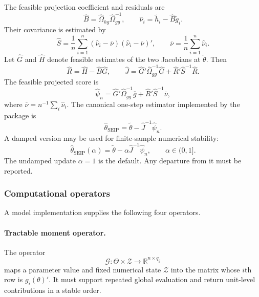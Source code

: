 The feasible projection coefficient and residuals are
\begin{equation}
 \widehat B
 =
 \widehat\Omega_{hg}
 \widehat\Omega_{gg}^{-1},
 \qquad
 \widehat\nu_i
 =
 \widetilde h_i-
 \widehat B\widetilde g_i.
 \label{eq:app_feasible_projection}
\end{equation}
Their covariance is estimated by
\begin{equation}
 \widehat S
 =
 \frac{1}{n}\sum_{i=1}^n
 (\widehat\nu_i-\overline\nu)
 (\widehat\nu_i-\overline\nu)',
 \qquad
 \overline\nu
 =
 \frac{1}{n}\sum_{i=1}^n\widehat\nu_i.
 \label{eq:app_feasible_S}
\end{equation}
Let $\widehat G$ and $\widehat H$ denote feasible estimates of the two
Jacobians at $\widetilde\theta$. Then
\begin{equation}
 \widehat R
 =
 \widehat H-
 \widehat B\widehat G,
 \qquad
 \widehat J
 =
 \widehat G'\widehat\Omega_{gg}^{-1}\widehat G
 +
 \widehat R'\widehat S^{-1}\widehat R.
 \label{eq:app_feasible_R_J}
\end{equation}
The feasible projected score is
\begin{equation}
 \widehat\psi_n
 =
 \widehat G'\widehat\Omega_{gg}^{-1}\overline g
 +
 \widehat R'\widehat S^{-1}\overline\nu,
 \label{eq:app_projected_score}
\end{equation}
where $\overline\nu=n^{-1}\sum_i\widehat\nu_i$. The canonical one-step
estimator implemented by the package is
\begin{equation}
 \widehat\theta_{\mathrm{SEIP}}
 =
 \widetilde\theta
 -
 \widehat J^{-1}\widehat\psi_n.
 \label{eq:app_seip_estimator}
\end{equation}
A damped version may be used for finite-sample numerical stability:
\begin{equation}
 \widehat\theta_{\mathrm{SEIP}}(\alpha)
 =
 \widetilde\theta
 -
 \alpha\widehat J^{-1}\widehat\psi_n,
 \qquad
 \alpha\in(0,1].
 \label{eq:app_damped_update}
\end{equation}
The undamped update $\alpha=1$ is the default. Any departure from it must be
reported.

\subsubsection{Computational operators}

A model implementation supplies the following four operators.

\paragraph{Tractable moment operator.}
The operator
\begin{equation}
 \mathcal G:
 \Theta\times\mathcal Z
 \longrightarrow
 \mathbb R^{n\times q_g}
 \label{eq:app_G_operator}
\end{equation}
maps a parameter value and fixed numerical state $\mathcal Z$ into the matrix
whose $i$th row is $g_i(\theta)'$. It must support repeated global evaluation
and return unit-level contributions in a stable order.

